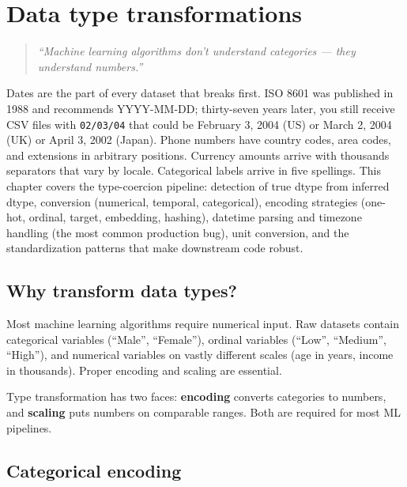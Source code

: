 \chapter{Data type transformations}
\label{ch:type-transforms}

\begin{quote}
\emph{``Machine learning algorithms don't understand categories --- they understand numbers.''}
\end{quote}

Dates are the part of every dataset that breaks first. ISO 8601 was published in 1988 and recommends YYYY-MM-DD; thirty-seven years later, you still receive CSV files with \texttt{02/03/04} that could be February 3, 2004 (US) or March 2, 2004 (UK) or April 3, 2002 (Japan). Phone numbers have country codes, area codes, and extensions in arbitrary positions. Currency amounts arrive with thousands separators that vary by locale. Categorical labels arrive in five spellings. This chapter covers the type-coercion pipeline: detection of true dtype from inferred dtype, conversion (numerical, temporal, categorical), encoding strategies (one-hot, ordinal, target, embedding, hashing), datetime parsing and timezone handling (the most common production bug), unit conversion, and the standardization patterns that make downstream code robust.

\section{Why transform data types?}

Most machine learning algorithms require numerical input. Raw datasets contain categorical variables (``Male'', ``Female''), ordinal variables (``Low'', ``Medium'', ``High''), and numerical variables on vastly different scales (age in years, income in thousands). Proper encoding and scaling are essential.

\begin{datatip}
Type transformation has two faces: \textbf{encoding} converts categories to numbers, and \textbf{scaling} puts numbers on comparable ranges. Both are required for most ML pipelines.
\end{datatip}

\section{Categorical encoding}

